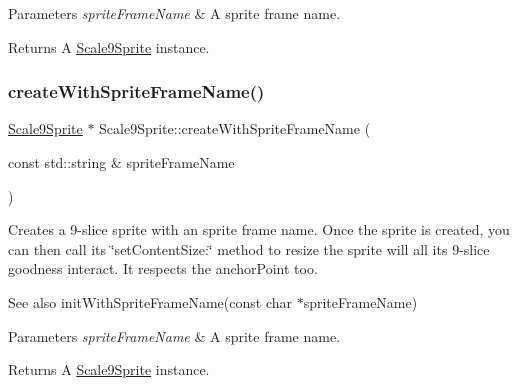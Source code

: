 \begin{DoxyParams}{Parameters}
{\em sprite\+Frame\+Name} & A sprite frame name. \\
\hline
\end{DoxyParams}
\begin{DoxyReturn}{Returns}
A \hyperlink{classui_1_1Scale9Sprite}{Scale9\+Sprite} instance. 
\end{DoxyReturn}
\mbox{\label{classui_1_1Scale9Sprite_a96e532a82e63aa8e8e540b783b5ea632}} 
\subsubsection{\texorpdfstring{create\+With\+Sprite\+Frame\+Name()}{createWithSpriteFrameName()}\hspace{0.1cm}{\footnotesize\ttfamily [2/4]}}
{\footnotesize\ttfamily \hyperlink{classui_1_1Scale9Sprite}{Scale9\+Sprite} $\ast$ Scale9\+Sprite\+::create\+With\+Sprite\+Frame\+Name (\begin{DoxyParamCaption}\item[{const std\+::string \&}]{sprite\+Frame\+Name }\end{DoxyParamCaption})\hspace{0.3cm}{\ttfamily [static]}}

Creates a 9-\/slice sprite with an sprite frame name. Once the sprite is created, you can then call its \char`\"{}set\+Content\+Size\+:\char`\"{} method to resize the sprite will all it\textquotesingle{}s 9-\/slice goodness interact. It respects the anchor\+Point too.

\begin{DoxySeeAlso}{See also}
init\+With\+Sprite\+Frame\+Name(const char $\ast$sprite\+Frame\+Name) 
\end{DoxySeeAlso}

\begin{DoxyParams}{Parameters}
{\em sprite\+Frame\+Name} & A sprite frame name. \\
\hline
\end{DoxyParams}
\begin{DoxyReturn}{Returns}
A \hyperlink{classui_1_1Scale9Sprite}{Scale9\+Sprite} instance. 
\end{DoxyReturn}
\mbox{\label{classui_1_1Scale9Sprite_ab417d698fb63900224c7693a8794f922}} 
